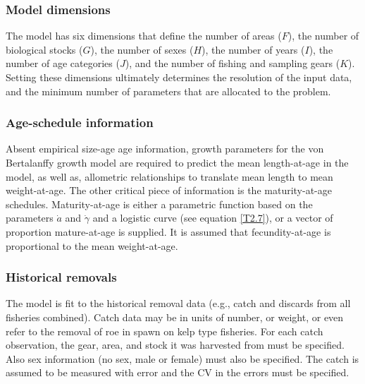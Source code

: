     \subsubsection{Model dimensions} %
    \label{ssub:model_dimensions}
        The model has six dimensions that define the number of areas ($F$), the number of biological stocks ($G$), the number of sexes ($H$), the number of years ($I$), the number of age categories ($J$), and the number of fishing and sampling gears ($K$).  Setting these dimensions ultimately determines the resolution of the input data, and the minimum number of parameters that are allocated to the problem.
    \subsubsection{Age-schedule information} %
    \label{ssub:age_schedule_information}
        Absent empirical size-age age information, growth parameters for the von Bertalanffy growth model are required to predict the mean length-at-age in the model, as well as, allometric relationships to translate mean length to mean weight-at-age.  The other critical piece of information is the maturity-at-age schedules.  Maturity-at-age is either a parametric function based on the parameters $\dot{a}$ and $\dot{\gamma}$ and a logistic curve (see equation \ref{T2.7}), or a vector of proportion mature-at-age is supplied.  It is assumed that fecundity-at-age is proportional to the mean weight-at-age. %
    \subsubsection{Historical removals} %
    \label{ssub:historical_removals}
        The model is fit to the historical removal data (e.g., catch and discards from all fisheries combined).  Catch data may be in units of number, or weight, or even refer to the removal of  roe in spawn on kelp type fisheries.  For each catch observation, the gear, area, and stock it was harvested from must be specified.  Also sex information (no sex, male or female) must also be specified.  The catch is assumed to be measured with error and the CV in the errors must be specified.


